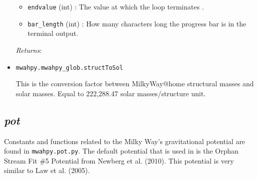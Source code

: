 \documentclass{article}
\begin{document}
\begin{itemize}
\begin{itemize}
\item \verb!endvalue! (int) : The value at which the loop terminates .

\item \verb!bar_length! (int) : How many characters long the progress bar is in the terminal output.

\end{itemize}

\textit{Returns}:



\item \verb!mwahpy.mwahpy_glob.structToSol!

This is the conversion factor between MilkyWay@home structural masses and solar masses. Equal to 222,288.47 solar masses/structure unit.

\end{itemize} 

\subsection{\textit{pot}}

Constants and functions related to the Milky Way's gravitational potential are found in \verb!mwahpy.pot.py!. The default potential that is used in \mwahpy is the Orphan Stream Fit \#5 Potential from Newberg et al. (2010). This potential is very similar to Law et al. (2005). 
\end{document}
